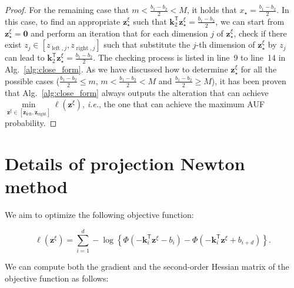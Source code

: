 \documentclass{article}
\theoremstyle{plain}
\theoremstyle{definition}
\def \ie {\textit{i.e.}}
\def \k {\mathbf{k}}
\def \z {\mathbf{z}}
\begin{document}
\begin{proof}
  For the remaining case that $m<\frac{b_1-b_2}{2}<M$, it holds that $x_\star = \frac{b_1-b_2}{2}$. In this case, to find an appropriate $\z^\xi_\star$ such that $\k_2^\mathsf{T} \z^\xi_\star = \frac{b_1-b_2}{2}$, we can start from $\z^\xi_\star = \bm{0}$ and perform an iteration that for each dimension $j$ of $\z^\xi_\star$, check if there exist $z_j \in [z_{\operatorname{left}, j}, z_{\operatorname{right}, j}]$ such that substitute the $j$-th dimension of $\z^\xi_\star$ by $z_j$ can lead to $\k_2^\mathsf{T} \z^\xi_\star = \frac{b_1-b_2}{2}$. The checking process is listed in line~9 to line~14 in Alg.~\ref{alg:close_form}. As we have discussed how to determine $\z^\xi_\star$ for all the possible cases ($\frac{b_1-b_2}{2}\leq m$, $m<\frac{b_1-b_2}{2}<M$ and $\frac{b_1-b_2}{2}\geq M$), it has been proven that Alg.~\ref{alg:close_form} always outputs the alteration that can achieve $\mathop{\min}\limits_{\z^\xi\in[\z_{\operatorname{left}}, \z_{\operatorname{right}}]}\ell(\z^\xi)$, \ie, the one that can achieve the maximum AUF probability.
\end{proof}


\section{Details of projection Newton method}
\label{sec:proj_Newton}

We aim to optimize the following objective function:

\[
    \ell\left(\z^\xi\right) = \sum_{i=1}^d -\log \left\{ \Phi\left(-\k_i^\mathsf{T} \z^\xi - b_i\right) - \Phi\left(-\k_i^\mathsf{T} \z^\xi + b_{i+d}\right) \right\}.
\]

We can compute both the gradient and the second-order Hessian matrix of the objective function as follows:
\end{document}
